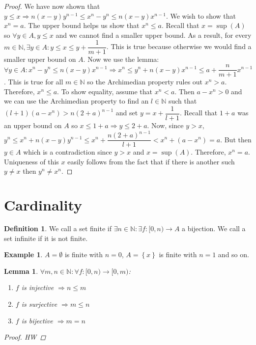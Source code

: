 \documentclass{article}
\newcommand\N{\ensuremath{\mathbb{N}}}
\renewcommand\O{\ensuremath{\emptyset}}
\newtheorem{lemma}[theorem]{Lemma}
\theoremstyle{definition}
\newtheorem{definition}{Definition}[subsection]
\newtheorem{eg}{Example}[subsection]
\theoremstyle{remark}
\theoremstyle{plain}
\begin{document}
\begin{proof}
    We have now shown that \(y \leq x \Rightarrow n(x-y)y^{n-1} \leq x^n - y^n \leq n(x-y)x^{n-1}\). We wish to show that 
    \(x^n = a\). The upper bound helps us show that \(x^n \leq a\). Recall that \(x = \sup(A)\) so \(\forall y \in A, y \leq x\) and 
    we cannot find a smaller upper bound. As a result, for every \(m \in \N, \exists y\in A: y \leq x \leq y + \dfrac{1}{m+1}\). This is true because otherwise
    we would find a smaller upper bound on \(A\). Now we use the lemma: \(\forall y \in A: x^n - y^n \leq n(x-y)x^{n-1} \Rightarrow x^n \leq y^n + n(x-y)x^{n-1} \leq a + \dfrac{n}{m+1}x^{n-1}\).
    This is true for all \(m \in \N\) so the Archimedian property rules out \(x^n > a\). Therefore, \(x^n \leq a\). To show equality, 
    assume that \(x^n < a\). Then \(a-x^n > 0\) and we can use the Archimedian property to find an \(l \in \N\) such that \((l+1)(a-x^n) > n(2+a)^{n-1}\) and set \(y = x + \dfrac{1}{l+1}\). 
    Recall that \(1+a\) was an upper bound on \(A\) so \(x \leq 1 + a \Rightarrow y \leq 2+a\). Now, since \(y > x\), \(y^n \leq x^n + n(x-y)y^{n-1} \leq x^n + \dfrac{n(2+a)^{n-1}}{l+1} < x^n + (a-x^n) = a\). 
    But then \(y \in A\) which is a contradiction since \(y> x\) and \(x = \sup(A)\). Therefore, \(x^n = a\). \\
    Uniqueness of this \(x\) easily follows from the fact that if there is another such \(y\neq x\) then \(y^n \neq x^n\).
\end{proof}

\section{Cardinality}

\begin{definition}
    We call a set finite if \(\exists n \in \N : \exists f: [0,n) \to A\) a bijection. We call a set infinite if it is not finite.
\end{definition}
\begin{eg}
    \(A = \O\) is finite with \(n=0\), \(A = \left\{ x \right\}\) is finite with \(n = 1\) and so on.
\end{eg}

\begin{lemma}
    \(\forall m,n \in \N: \forall f: [0,n) \to [0, m)\):
    \begin{enumerate}
        \item \(f\) is injective \(\Rightarrow n \leq m\) 
        \item \(f\) is surjective \(\Rightarrow m \leq n\)
        \item \(f\) is bijective \(\Rightarrow m = n \)
    \end{enumerate}
    \begin{proof}
        HW
    \end{proof}
\end{lemma}
\end{document}
